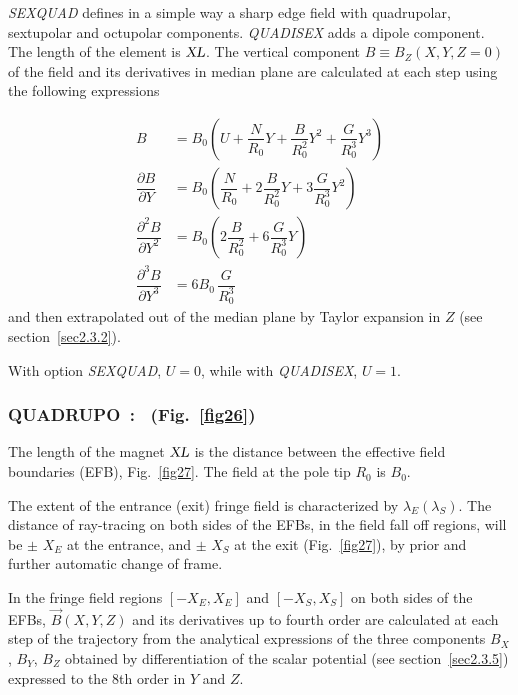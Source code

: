 {\textsl{SEXQUAD}    defines in a simple way a sharp edge field with quadrupolar, 
sextupolar and octupolar components. \textsl{QUADISEX}  adds a dipole component. The length of 
the element is $ \textsl{XL} $.  The vertical component $ B \equiv B_Z(X,Y,Z=0) $ of the field and its derivatives in median plane are 
calculated at each step using the following expressions 

\begin{align*}
	B &   =     B_0
	           \left(U+ \dfrac{N }{ R_0}Y + 
	                \dfrac{B }{ R^2_0} Y^2+ \dfrac{G }{ R^3_0} Y^3 \right)  \\
	\dfrac{ \partial B }{ \partial Y} 
	   &   =   B_0 \left(
	             \dfrac{N }{ R_0} + 2 \dfrac{B }{ R^2_0} Y + 3\dfrac{G }{ R^3_0}Y^2 \right) \\  
	\dfrac{ \partial^ 2B }{ \partial Y^2} 
	  &  =     B_0 \left(2 \dfrac{B }{ R^2_0} + 6\dfrac{G }{ R^3_0} Y \right) \\
	\dfrac{ \partial^ 3B }{ \partial Y^3}  
	   & =     6B_0 \,  \dfrac{G }{ R^3_0}
\end{align*}  
    and then extrapolated out of the median plane by Taylor expansion in $ Z $ 
(see section~\ref{sec2.3.2}).
\medskip

\noindent With option \textsl{SEXQUAD}, $ U=0$,  while with \textsl{QUADISEX}, $U=1 $. 

\newpage

\subsubsection*{QUADRUPO~:  \QUADRUPOTitl\  (Fig.~\protect\ref{fig26}) } \label{QUADRUPO} 
\medskip

The length of the magnet $ \textsl{XL} $ is the distance between the
effective field boundaries (EFB), Fig.~\ref{fig27}. The field at the pole tip $ R_0 $ is $ B_0 $. 

\noindent The extent of the  entrance (exit) fringe field is characterized by 
$ \lambda_ E(\lambda_ S) $.  The distance of ray-tracing on both sides of the
EFBs, in the field fall off regions, will be $\pm$  $ X_E $ at 
the entrance, and $\pm$  $ X_S $ at the exit (Fig.~\ref{fig27}),  
by prior and further automatic change of frame. 

\noindent In the fringe field  regions $[ -X_E,X_E ]$  and 
$[ -X_S,X_S ]$ on both sides of the EFBs, $ \vec  B(X,Y,Z) $ and its derivatives up to
fourth order are calculated at each step of the trajectory from the analytical expressions 
of the three components $ B_X $, $ B_Y $, $ B_Z $ obtained by differentiation
of the scalar potential (see section~\ref{sec2.3.5}) expressed to the 8th order in $ Y $ 
and $ Z $. 

}
